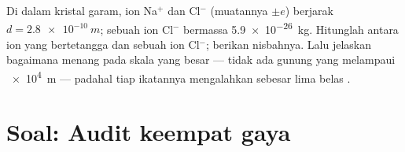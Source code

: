 \begin{exercise}[$\star\star\star$]\label{exo:g11:fundamental-interactions:15}
Di dalam kristal garam, ion Na$^{+}$ dan Cl$^{-}$ (muatannya $\pm e$)
berjarak $d = \qty{2.8e-10}{m}$; sebuah ion Cl$^{-}$ bermassa
\qty{5.9e-26}{kg}. Hitunglah  antara ion yang bertetangga dan 
sebuah ion Cl$^{-}$; berikan nisbahnya. Lalu jelaskan bagaimana
 menang pada skala yang besar --- tidak ada gunung yang
melampaui \qty{e4}{m} --- padahal tiap ikatannya mengalahkan 
sebesar lima belas .
\end{exercise}

\section{Soal: Audit keempat gaya}

